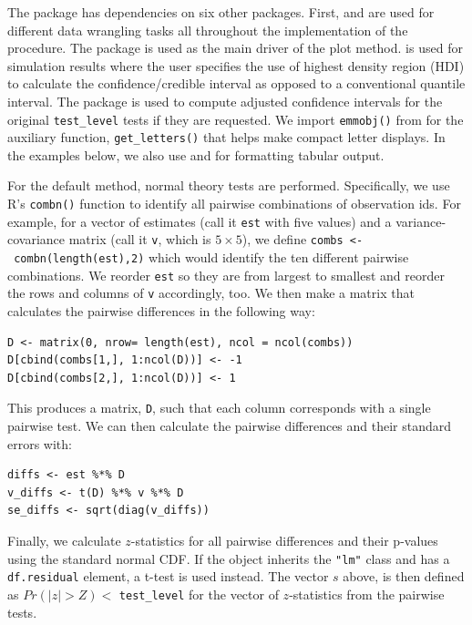 The package has dependencies on six other packages. First,  \citep{dplyr} and  \citep{tidyr} are used for different data wrangling tasks all throughout the implementation of the procedure. The  package \citep{ggplot2} is used as the main driver of the plot method.  \citep{HDInterval} is used for simulation results where the user specifies the use of highest density region (HDI) to calculate the confidence/credible interval as opposed to a conventional quantile interval. The  package \citep{multcomp} is used to compute adjusted confidence intervals for the original \texttt{test\_level} tests if they are requested. We import \texttt{emmobj()} from  \citep{emmeans} for the auxiliary function, \texttt{get\_letters()} that helps make compact letter displays. In the examples below, we also use  \citep{broom} and  \citep{gt} for formatting tabular output.

For the default method, normal theory tests are performed. Specifically, we use R's \texttt{combn()} function to identify all pairwise combinations of observation ids. For example, for a vector of estimates (call it \texttt{est} with five values) and a variance-covariance matrix (call it \texttt{v}, which is \(5\times5\)), we define \texttt{combs\ \textless{}-\ combn(length(est),2)} which would identify the ten different pairwise combinations. We reorder \texttt{est} so they are from largest to smallest and reorder the rows and columns of \texttt{v} accordingly, too. We then make a matrix that calculates the pairwise differences in the following way:

\begin{verbatim}
D <- matrix(0, nrow= length(est), ncol = ncol(combs))
D[cbind(combs[1,], 1:ncol(D))] <- -1
D[cbind(combs[2,], 1:ncol(D))] <- 1
\end{verbatim}

\noindent This produces a matrix, \texttt{D}, such that each column corresponds with a single pairwise test. We can then calculate the pairwise differences and their standard errors with:

\begin{verbatim}
diffs <- est %*% D
v_diffs <- t(D) %*% v %*% D
se_diffs <- sqrt(diag(v_diffs))
\end{verbatim}

\noindent Finally, we calculate \(z\)-statistics for all pairwise differences and their p-values using the standard normal CDF. If the object inherits the \texttt{"lm"} class and has a \texttt{df.residual} element, a t-test is used instead. The vector \(s\) above, is then defined as \(Pr(|z| > Z) <\) \texttt{test\_level} for the vector of \(z\)-statistics from the pairwise tests.

